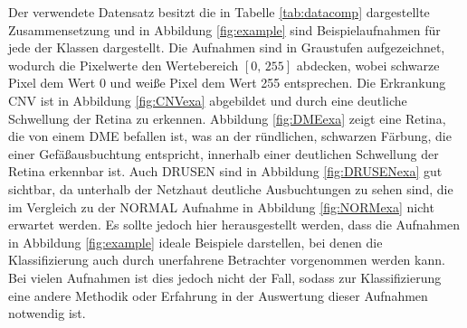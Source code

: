 Der verwendete Datensatz besitzt die in Tabelle \ref{tab:datacomp} dargestellte Zusammensetzung und in Abbildung \ref{fig:example} sind Beispielaufnahmen für jede der Klassen dargestellt. Die Aufnahmen sind in Graustufen aufgezeichnet, wodurch die Pixelwerte den Wertebereich $[0,\,255]$ abdecken, wobei schwarze Pixel dem Wert 0 und weiße Pixel dem Wert 255 entsprechen. Die Erkrankung CNV ist in Abbildung \ref{fig:CNVexa} abgebildet und durch eine deutliche Schwellung der Retina zu erkennen. Abbildung \ref{fig:DMEexa} zeigt eine Retina, die von einem DME befallen ist, was an der ründlichen, schwarzen Färbung, die einer Gefäßausbuchtung entspricht, innerhalb einer deutlichen Schwellung der Retina erkennbar ist. Auch DRUSEN sind in Abbildung \ref{fig:DRUSENexa} gut sichtbar, da unterhalb der Netzhaut deutliche Ausbuchtungen zu sehen sind, die im Vergleich zu der NORMAL Aufnahme in Abbildung \ref{fig:NORMexa} nicht erwartet werden. Es sollte jedoch hier herausgestellt werden, dass die Aufnahmen in Abbildung \ref{fig:example} ideale Beispiele darstellen, bei denen die Klassifizierung auch durch unerfahrene Betrachter vorgenommen werden kann. Bei vielen Aufnahmen ist dies jedoch nicht der Fall, sodass zur Klassifizierung eine andere Methodik oder Erfahrung in der Auswertung dieser Aufnahmen notwendig ist.  
